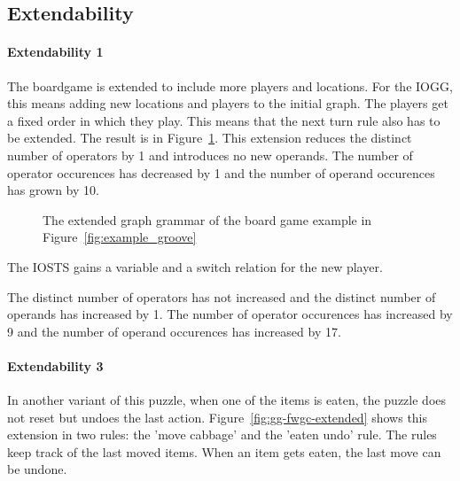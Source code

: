 \subsection{Extendability}
\paragraph*{Extendability 1}
The boardgame is extended to include more players and locations. For the IOGG, this means adding new locations and players to the initial graph. The players get a fixed order in which they play. This means that the next turn rule also has to be extended. The result is in Figure~\ref{fig:gg-bg-extended}. This extension reduces the distinct number of operators by 1 and introduces no new operands. The number of operator occurences has decreased by 1 and the number of operand occurences has grown by 10.

\begin{figure}[ht]
  \begin{center}
    \hspace{20px}
  \end{center}
  \caption{The extended graph grammar of the board game example in Figure~\ref{fig:example_groove}}
  \label{fig:gg-bg-extended}
\end{figure}

The IOSTS gains a variable and a switch relation for the new player. \begin{comment}The result is in Figure~\ref{fig:sts-bg-extended}.\end{comment} The distinct number of operators has not increased and the distinct number of operands has increased by 1. The number of operator occurences has increased by 9 and the number of operand occurences has increased by 17.

\paragraph*{Extendability 3}
In another variant of this puzzle, when one of the items is eaten, the puzzle does not reset but undoes the last action. Figure~\ref{fig:gg-fwgc-extended} shows this extension in two rules: the 'move cabbage' and the 'eaten undo' rule. The rules keep track of the last moved items. When an item gets eaten, the last move can be undone.

